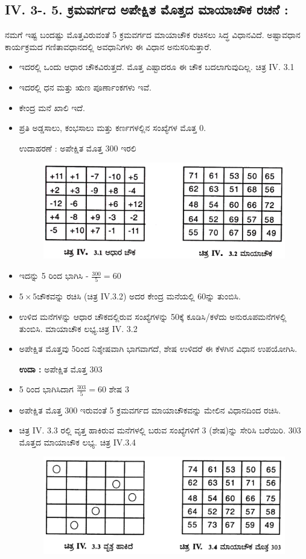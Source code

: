 \subsection{IV. 3-. 5. ಕ್ರಮವರ್ಗದ ಅಪೇಕ್ಷಿತ ಮೊತ್ತದ ಮಾಯಾಚೌಕ ರಚನೆ :}

ನಮಗೆ ಇಷ್ಟ ಬಂದಷ್ಟು ಮೊತ್ತವಿರುವಂತೆ 5 ಕ್ರಮವರ್ಗದ ಮಾಯಾಚೌಕ ರಚಿಸಲು ಸಿದ್ಧ ವಿಧಾನವಿದೆ. ಅಷ್ಟಾವಧಾನ ಕಾರ್ಯಕ್ರಮದ ಗಣಿತಾವಧಾನದಲ್ಲಿ ಅವಧಾನಿಗಳು ಈ ವಿಧಾನ ಅನುಸರಿಸುತ್ತಾರೆ.
\begin{itemize}
	\item ಇದರಲ್ಲಿ ಒಂದು ಆಧಾರ ಚೌಕವಿರುತ್ತದೆ. ಮೊತ್ತ ಎಷ್ಟಾದರೂ ಈ ಚೌಕ ಬದಲಾಗುವುದಿಲ್ಲ. ಚಿತ್ರ IV. 3.1
	\item ಇದರಲ್ಲಿ ಧನ ಮತ್ತು ಋಣ ಪೂರ್ಣಾಂಕಗಳು ಇವೆ.
	\item ಕೇಂದ್ರ ಮನೆ ಖಾಲಿ ಇದೆ.
	\item ಪ್ರತಿ ಅಡ್ಡಸಾಲು, ಕಂಭಸಾಲು ಮತ್ತು ಕರ್ಣಗಳಲ್ಲಿನ ಸಂಖ್ಯೆಗಳ ಮೊತ್ತ 0.

	ಉದಾಹರಣೆ : ಅಪೇಕ್ಷಿತ ಮೊತ್ತ 300 ಇರಲಿ
	\begin{figure}[h]
	\includegraphics{src/figures/chap3/fig3.41.jpg}
	\end{figure}
	\item ಇದನ್ನು 5 ರಿಂದ ಭಾಗಿಸಿ - $\frac{300}{5}=60$
	\item $5 \times 5$ಚೌಕವನ್ನು ರಚಿಸಿ (ಚಿತ್ರ IV.3.2) ಅದರ ಕೇಂದ್ರ ಮನೆಯಲ್ಲಿ 60ನ್ನು ತುಂಬಿಸಿ.
	\item ಉಳಿದ ಮನೆಗಳನ್ನು ಆಧಾರ ಚೌಕದಲ್ಲಿರುವ ಸಂಖ್ಯೆಗಳನ್ನು 50ಕ್ಕೆ ಕೂಡಿಸಿ/ಕಳೆದು ಅನುರೂಪಮನೆಗಳಲ್ಲಿ ತುಂಬಿಸಿ. ಮಾಯಾಚೌಕ ಲಭ್ಯ.ಚಿತ್ರ IV. 3.2
	\item ಅಪೇಕ್ಷಿತ ಮೊತ್ತವು 5ರಿಂದ ನಿಶ್ಶೇಷವಾಗಿ ಭಾಗವಾಗದೆ, ಶೇಷ ಉಳಿದರೆ ಈ ಕೆಳಗಿನ ವಿಧಾನ ಉಪಯೋಗಿಸಿ.

	\textbf{ಉದಾ :} ಅಪೇಕ್ಷಿತ ಮೊತ್ತ 303
	\item 5 ರಿಂದ ಭಾಗಿಸಿದಾಗ $\frac{303}{5}=60$ ಶೇಷ 3
	\item ಅಪೇಕ್ಷಿತ ಮೊತ್ತ 300 ಇರುವಂತೆ 5 ಕ್ರಮವರ್ಗದ ಮಾಯಾಚೌಕವನ್ನು ಮೇಲಿನ ವಿಧಾನದಿಂದ ರಚಿಸಿ.
	\item ಚಿತ್ರ IV. 3.3 ರಲ್ಲಿ ವೃತ್ತ ಹಾಕಿರುವ ಮನೆಗಳಲ್ಲಿ ಬರುವ ಸಂಖ್ಯೆಗಳಿಗೆ 3 (ಶೇಷ)ನ್ನು ಸೇರಿಸಿ ಬರೆಯಿರಿ. 303 ಮೊತ್ತದ ಮಾಯಾಚೌಕ ಲಭ್ಯ. ಚಿತ್ರ IV.3.4
	\begin{figure}[h]
	\includegraphics{src/figures/chap3/fig3.42.jpg}
	\end{figure}
\end{itemize}

